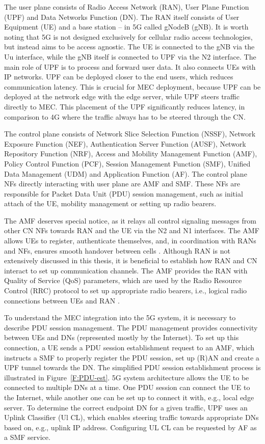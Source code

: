\documentclass[12pt,a4paper,twoside]{report}
\begin{document}
The user plane consists of Radio Access Network (RAN), User Plane Function (UPF) and Data Networks Function (DN). The RAN itself consists of User Equipment (UE) and a base station – in 5G called gNodeB (gNB). It is worth noting that 5G is not designed exclusively for cellular radio access technologies, but instead aims to be access agnostic. The UE is connected to the gNB via the Uu interface, while the gNB itself is connected to UPF via the N2 interface. The main role of UPF is to process and forward user data. It also connects UEs with IP networks. UPF can be deployed closer to the end users, which reduces communication latency. This is crucial for MEC deployment, because UPF can be deployed at the network edge with the edge server, while UPF steers traffic directly to MEC. This placement of the UPF significantly reduces latency, in comparison to 4G where the traffic always has to be steered through the CN. \cite{rommer20195g}

The control plane consists of Network Slice Selection Function (NSSF), Network Exposure Function (NEF), Authentication Server Function (AUSF), Network Repository Function (NRF), Access and Mobility Management Function (AMF), Policy Control Function (PCF), Session Management Function (SMF), Unified Data Management (UDM) and Application Function (AF). The control plane NFs directly interacting with user plane are AMF and SMF. These NFs are responsible for Packet Data Unit (PDU) session management, such as initial attach of the UE, mobility management or setting up radio bearers. \cite{rommer20195g}
  
The AMF deserves special notice, as it relays all control signaling messages from other CN NFs towards RAN and the UE via the N2 and N1 interfaces. The AMF allows UEs to register, authenticate themselves, and, in coordination with RANs and NFs, ensures smooth handover between cells \cite{rommer20195g}. Although RAN is not extensively discussed in this thesis, it is beneficial to establish how RAN and CN interact to set up communication channels. The AMF provides the RAN with Quality of Service (QoS) parameters, which are used by the Radio Resource Control (RRC) protocol to set up appropriate radio bearers, i.e., logical radio connections between UEs and RAN \cite{dahlman-2020-5g}.
  
To understand the MEC integration into the 5G system, it is necessary to describe PDU session management. The PDU management provides connectivity between UEs and DNs (represented mostly by the Internet). To set up this connection, a UE sends a PDU session establishment request to an AMF, which instructs a SMF to properly register the PDU session, set up (R)AN and create a UPF tunnel towards the DN. The simplified PDU session establishment process is illustrated in Figure~\ref{F:PDU-est}. 5G system architecture allows the UE to be connected to multiple DNs at a time. One PDU session can connect the UE to the Internet, while another one can be set up to connect it with, e.g., local edge server. To determine the correct endpoint DN for a given traffic, UPF uses an Uplink Classifier (Ul CL), which enables steering traffic towards appropriate DNs based on, e.g., uplink IP address. Configuring UL CL can be requested by AF as a SMF service. \cite{rommer20195g}
\end{document}
